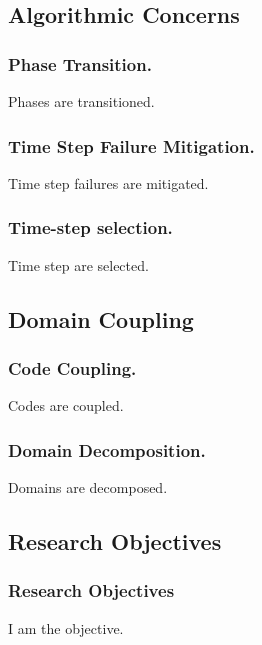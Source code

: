 \documentclass[compress]{beamer}
\begin{document}
\subsection[Algorithmic Concerns]{Algorithmic Concerns}
\begin{frame}
\frametitle{Phase Transition.}

Phases are transitioned.

\end{frame}
\begin{frame}
\frametitle{Time Step Failure Mitigation.}

Time step failures are mitigated.

\end{frame}
\begin{frame}
\frametitle{Time-step selection.}

Time step are selected.

\end{frame}
\subsection[Domain Coupling]{Domain Coupling}
\begin{frame}
\frametitle{Code Coupling.}

Codes are coupled.

\end{frame}
\begin{frame}
\frametitle{Domain Decomposition.}

Domains are decomposed.

\end{frame}
\subsection[Research Objectives]{Research Objectives}
\begin{frame}
\frametitle{Research Objectives}

I am the objective.

\end{frame}
\end{document}
